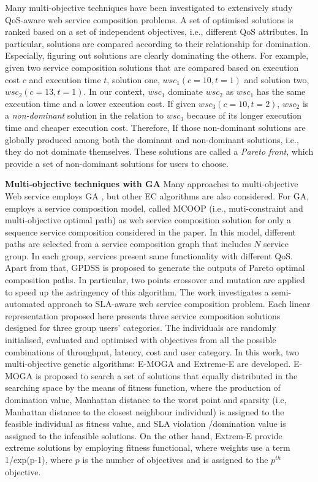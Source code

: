 Many multi-objective techniques \cite{liu2005dynamic,zhang2010qos,yu2013efficient,yin2014hybrid,xiang2014qos,chen2014partial} have been investigated to extensively study QoS-aware web service composition problems.  A set of optimised solutions is ranked based on a set of independent objectives, i.e., different QoS attributes. In particular, solutions are compared according to their relationship for domination. Especially, figuring out solutions are clearly dominating the others. For example, given two service composition solutions that are compared based on execution cost $c$ and execution time $t$, solution one, $wsc_1(c=10,t=1)$ and solution two,  $wsc_2(c=13,t=1)$. In our context, $wsc_1$ dominate $wsc_2$ as $wsc_1$ has the same execution time and a lower execution cost. If given $wsc_3(c=10,t=2)$, $wsc_2$ is a \textit{non-dominant} solution in the relation to $wsc_3$ because of its longer execution time and cheaper execution cost. Therefore,  If those non-dominant solutions are globally produced among both the dominant and non-dominant solutions, i.e., they do not dominate themselves. These solutions are called a \textit{Pareto front}, which provide a set of non-dominant solutions for users to choose.


\textbf{Multi-objective techniques with GA} Many approaches to multi-objective Web service employs GA \cite{liu2005dynamic}, but other EC algorithms are also considered. For GA, \cite{liu2005dynamic} employs a service composition model, called  MCOOP (i.e., muti-constraint and multi-objective optimal path) as web service composition solution for only a sequence service composition considered in the paper. In this model, different paths are selected from a service composition graph that includes $N$ service group. In each group,  services present same functionality with different QoS.  Apart from that, GPDSS is proposed to generate the outputs of Pareto optimal composition paths. In particular, two points crossover and mutation are applied to speed up the astringency of this algorithm. The work \cite{wada2012e3} investigates a semi-automated approach to SLA-aware web service composition problem.  Each linear representation proposed here presents three service composition solutions designed for three group users' categories.  The individuals are randomly initialised, evaluated and optimised with objectives from all the possible combinations of throughput, latency, cost and user category.  In this work, two multi-objective genetic algorithms: E-MOGA and Extreme-E are developed. E-MOGA is proposed to search a set of solutions that equally distributed in the searching space by the means of fitness function, where the production of domination value,  Manhattan distance to the worst point and sparsity (i.e, Manhattan distance to the closest neighbour individual)  is assigned to the feasible individual as fitness value, and SLA violation /domination value is assigned to the infeasible solutions. On the other hand, Extrem-E provide extreme solutions by employing fitness functional, where weights use a term 1/exp(p-1), where $p$ is the number of objectives and is assigned to the $p^{th}$ objective.

